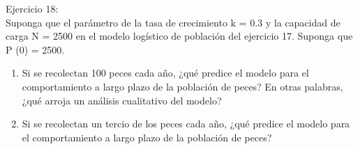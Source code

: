 \documentclass{article}
\begin{document}
Ejercicio 18: \\ 
Suponga que el parámetro de la tasa de crecimiento k = 0.3 y la capacidad de carga 
N = 2500 en el modelo 
logístico de población del ejercicio 17. Suponga que P (0) = 2500.
\begin{enumerate}
    \item  Si se recolectan 100 peces cada año, ¿qué predice el modelo para el 
    comportamiento a largo plazo de la población de peces? En otras palabras, 
    ¿qué arroja un análisis cualitativo del modelo?
    \item Si se recolectan un tercio de los peces cada año, ¿qué predice el modelo para 
    el comportamiento a largo plazo de la población de peces?
\end{enumerate}
\end{document}
